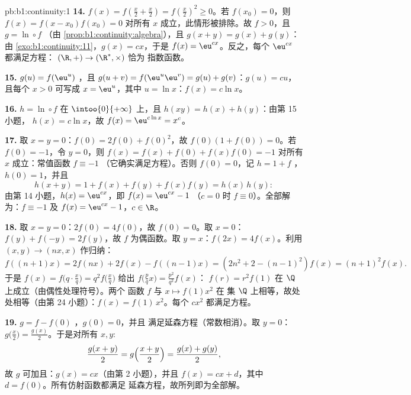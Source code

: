 \begin{solution}{pb:b1:continuity:1}
\textbf{14.} $f(x) = f(\frac x2 + \frac x2) = f(\frac x2)^2 \geq
0$。若 $f(x_0) = 0$，则 $f(x) = f(x - x_0)f(x_0) = 0$ 对所有
$x$ 成立，此情形被排除。故 $f > 0$，且 $g = \ln \circ f$ 
（由 \cref{prop:b1:continuity:algebra}），且 $g(x + y) = g(x) +
g(y)$：由 \cref{exo:b1:continuity:11}，$g(x) = cx$，于是 $f(x) =
\eu^{cx}$。反之，每个 $\eu^{cx}$ 都满足方程：
 $(\R, +) \to (\R^*, \times)$ 恰为
指数函数。

\textbf{15.} $g(u) = f(\eu^u)$ ，且 $g(u + v) =
f(\eu^u \eu^v) = g(u) + g(v)$：$g(u) = cu$，且每个 $x > 0$
可写成 $x = \eu^u$，其中 $u = \ln x$：$f(x) = c\ln x$。

\textbf{16.} $h = \ln \circ f$ 在
$\intoo{0}{+\infty}$ 上，且 $h(xy) = h(x) + h(y)$：由第 15 小题，
$h(x) = c\ln x$，故 $f(x) = \eu^{c\ln x} = x^c$。

\textbf{17.} 取 $x = y = 0$：$f(0) = 2f(0) + f(0)^2$，故 $f(0)(1 +
f(0)) = 0$。若 $f(0) = -1$，令 $y = 0$，则 $f(x) = f(x) +
f(0) + f(x)f(0) = -1$ 对所有 $x$ 成立：常值函数 $f \equiv -1$
（它确实满足方程）。否则 $f(0) = 0$，记 $h
= 1 + f$ ，$h(0) = 1$，并且
\[
h(x + y) = 1 + f(x) + f(y) + f(x)f(y) = h(x)\,h(y) :
\]
由第 14 小题，$h(x) = \eu^{cx}$，即 $f(x) = \eu^{cx} - 1$
（$c = 0$ 时 $f \equiv 0$）。全部解为：$f
\equiv -1$ 及 $f(x) = \eu^{cx} - 1$，$c \in \R$。

\textbf{18.} 取 $x = y = 0$：$2f(0) = 4f(0)$，故 $f(0) = 0$。取 $x =
0$：$f(y) + f(-y) = 2f(y)$，故 $f$ 为偶函数。取 $y = x$：$f(2x) =
4f(x)$。利用 $(x, y) \to (nx, x)$ 作归纳：
\[
f((n{+}1)x) = 2f(nx) + 2f(x) - f((n{-}1)x)
= (2n^2 + 2 - (n-1)^2) f(x) = (n+1)^2 f(x) .
\]
于是 $f(x) = f\bigl(q\cdot\frac xq\bigr) = q^2 f\bigl(\frac
xq\bigr)$ 给出 $f\bigl(\frac pq x\bigr) = \frac{p^2}{q^2}f(x)$：
$f(r) = r^2 f(1)$ 在 $\Q$ 上成立（由偶性处理符号）。两个
函数 $f$ 与 $x \mapsto f(1)x^2$ 在
集 $\Q$ 上相等，故处处相等（由第 24 小题）：$f(x) =
f(1)\,x^2$。每个 $cx^2$ 都满足方程。

\textbf{19.} $g = f - f(0)$ ，$g(0) = 0$，并且
满足延森方程（常数相消）。取 $y =
0$：$g\bigl(\frac x2\bigr) = \frac{g(x)}{2}$。于是对所有 $x,
y$:
\[
\frac{g(x + y)}{2} = g\Bigl(\frac{x+y}{2}\Bigr)
= \frac{g(x) + g(y)}{2} ,
\]
故 $g$ 可加且：$g(x) = cx$（由第 2 小题），并且
$f(x) = cx + d$，其中 $d = f(0)$。所有仿射函数都满足
延森方程，故所列即为全部解。


\end{solution}
